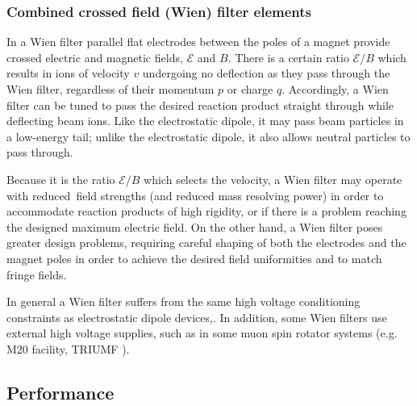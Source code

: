 \subsubsection{Combined crossed field (Wien) filter elements}


In a Wien filter parallel flat electrodes between the poles of a magnet provide crossed electric and magnetic fields, $\mathcal{E}$ and $B$.      There is a certain ratio $\mathcal{E}/B$ which results in ions of velocity $v$  undergoing no deflection as they pass through the Wien filter, regardless of their momentum $p$ or charge $q$.    Accordingly, a Wien filter can be tuned to pass the desired reaction product straight through while deflecting beam ions.  Like the electrostatic dipole, it may pass beam particles in  a low-energy tail; unlike the electrostatic dipole, it  also allows   neutral particles to pass through.

Because it is  the ratio $\mathcal{E}/B$ which selects the velocity, a Wien filter may operate with reduced\ field strengths (and reduced mass resolving power)  in order to accommodate reaction products of high rigidity, or if there is a problem reaching the designed maximum electric field.    On the other hand, a Wien filter poses greater design problems, requiring careful shaping of both the electrodes and the magnet poles in order to achieve the desired field uniformities and to match fringe fields. 

In general a Wien filter suffers from the same high voltage conditioning constraints as electrostatic dipole devices,. In addition, some Wien filters use external high voltage supplies, such as in some muon spin rotator systems (e.g. M20 facility, TRIUMF \cite{bev85}). 

\subsection{Performance}
\label{performance}


